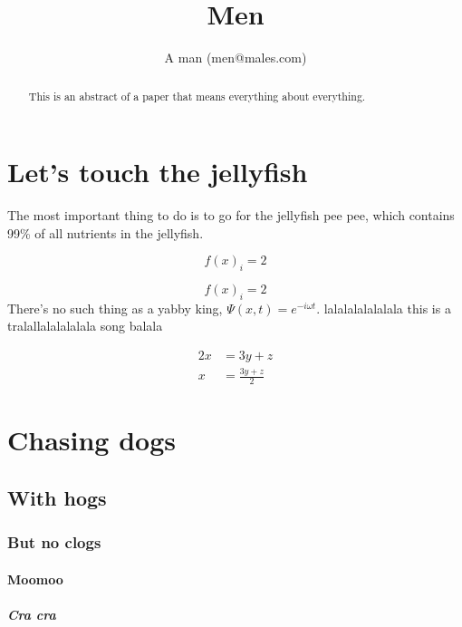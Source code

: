 \documentclass[]{article}
\title{Men}
\author{A man (men@males.com)}
\begin{document}
\maketitle

\begin{abstract}
This is an abstract of a paper that means everything about everything.
\end{abstract}

\section{Let's touch the jellyfish}
The most important thing to do is to go for the jellyfish pee pee, which contains 99\% of all nutrients in the jellyfish.

\begin{equation}
f(x)_{i} = 2
\end{equation}

\begin{equation*}
f(x)_{i} = 2
\end{equation*}
There's no such thing as a yabby king, $\Psi(x, t) = e^{-i\omega t}$. lalalalalalalala this is a tralallalalalalala song balala

\begin{align}
2x &= 3y + z\\
x &= \frac{3y + z}{2}
\end{align}

\section{Chasing dogs}
\subsection{With hogs}
\subsubsection{But no clogs}

\paragraph{Moomoo}
\subparagraph{Cra cra}
\end{document}
